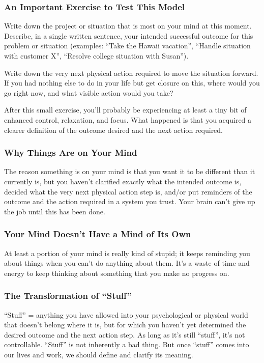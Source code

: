 \documentclass[letterpaper]{article}
\newcommand{\p}{\vspace{1em}\par}		%
\begin{document}
\subsubsection*{An Important Exercise to Test This Model}
Write down the project or situation that is most on your mind at this moment. Describe, in a single written sentence, your intended successful outcome for this problem or situation (examples: ``Take the Hawaii vacation'', ``Handle situation with customer X'', ``Resolve college situation with Susan'').

\p Write down the very next physical action required to move the situation forward. If you had nothing else to do in your life but get closure on this, where would you go right now, and what visible action would you take?

\p After this small exercise, you'll probably be experiencing at least a tiny bit of enhanced control, relaxation, and focus. What happened is that you acquired a clearer definition of the outcome desired and the next action required.

\subsubsection*{Why Things Are on Your Mind}
The reason something is on your mind is that you want it to be different than it currently is, but you haven't clarified exactly what the intended outcome is, decided what the very next physical action step is, and/or put reminders of the outcome and the action required in a system you trust. Your brain can't give up the job until this has been done.

\subsubsection*{Your Mind Doesn't Have a Mind of Its Own}
At least a portion of your mind is really kind of stupid; it keeps reminding you about things when you can't do anything about them. It's a waste of time and energy to keep thinking about something that you make no progress on.

\subsubsection*{The Transformation of ``Stuff''}
``Stuff'' = anything you have allowed into your psychological or physical world that doesn't belong where it is, but for which you haven't yet determined the desired outcome and the next action step. As long as it's still ``stuff'', it's not controllable. ``Stuff'' is not inherently a bad thing. But once ``stuff'' comes into our lives and work, we should define and clarify its meaning.
\end{document}
